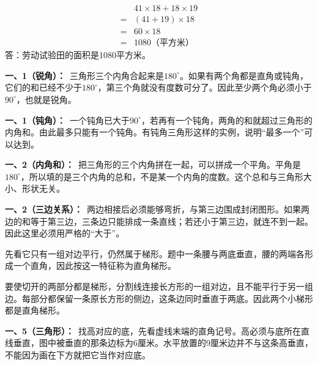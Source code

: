 \documentclass[multi=snippet,border=0pt]{standalone}
\newenvironment{snippet}[3]{\begin{minipage}{#1bp}\color{answerred}\fontsize{#2}{#3}\selectfont\raggedright}{\end{minipage}}
\begin{document}
\begin{snippet}{289}{10.5}{12.8}\[\begin{aligned}&41\times18+18\times19\\={}&(41+19)\times18\\={}&60\times18\\={}&1080\text{（平方米）}\end{aligned}\]答：劳动试验田的面积是1080平方米。\end{snippet}
\begin{snippet}{505}{11.5}{14}\textbf{一、1（锐角）：}\ 三角形三个内角合起来是\(180^\circ\)。如果有两个角都是直角或钝角，它们的和已经不少于\(180^\circ\)，第三个角就没有度数可分了。因此至少两个角必须小于\(90^\circ\)，也就是锐角。\end{snippet}
\begin{snippet}{505}{11.5}{14}\textbf{一、1（钝角）：}\ 一个钝角已大于\(90^\circ\)，若再有一个钝角，两角的和就超过三角形的内角和。由此最多只能有一个钝角。有钝角三角形这样的实例，说明“最多一个”可以达到。\end{snippet}
\begin{snippet}{505}{11.5}{14}\textbf{一、2（内角和）：}\ 把三角形的三个内角拼在一起，可以拼成一个平角。平角是\(180^\circ\)，所以填的是三个内角的总和，不是某一个内角的度数。这个总和与三角形大小、形状无关。\end{snippet}
\begin{snippet}{505}{11.5}{14}\textbf{一、2（三边关系）：}\ 两边相接后必须能够弯折，与第三边围成封闭图形。如果两边的和等于第三边，三条边只能排成一条直线；若还小于第三边，就连不到一起。因此这里必须用严格的“大于”。\end{snippet}
\begin{snippet}{505}{11.5}{14}先看它只有一组对边平行，仍然属于梯形。题中一条腰与两底垂直，腰的两端各形成一个直角，因此按这一特征称为直角梯形。\end{snippet}
\begin{snippet}{505}{11.5}{14}要使切开的两部分都是梯形，分割线连接长方形的一组对边，且不能平行于另一组边。每部分都保留一条原长方形的侧边，这条边同时垂直于两底。因此两个小梯形都是直角梯形。\end{snippet}
\begin{snippet}{505}{11.5}{14}\textbf{一、5（三角形）：}\ 找高对应的底，先看虚线末端的直角记号。高必须与底所在直线垂直，图中被垂直的那条边标为6厘米。水平放置的9厘米边并不与这条高垂直，不能因为画在下方就把它当作对应底。\end{snippet}
\end{document}
